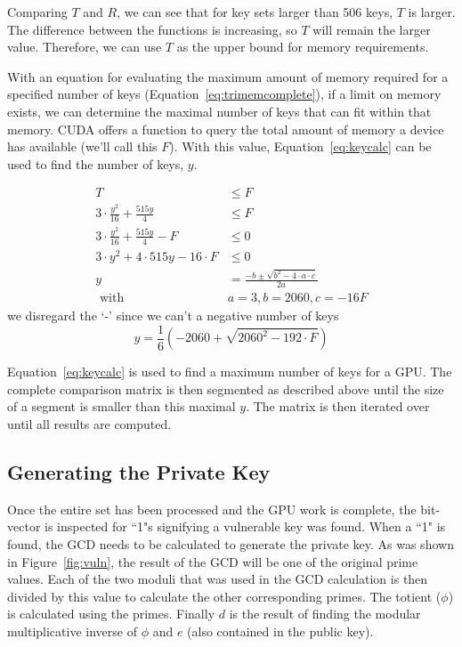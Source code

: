\documentclass[smallextended]{svjour3}       %
\begin{document}
Comparing $T$ and $R$, we can see that for key sets larger than 506 keys, $T$ is larger. The difference between the functions is increasing, so $T$ will remain the larger value. Therefore, we can use $T$ as the upper bound for memory requirements. 

With an equation for evaluating the maximum amount of memory required for a specified number of keys (Equation~\ref{eq:trimemcomplete}), if a limit on memory exists, we can determine the maximal number of keys that can fit within that memory. CUDA offers a function to query the total amount of memory a device has available (we'll call this $F$). With this value, Equation~\ref{eq:keycalc} can be used to find the number of keys, $y$.

\begin{align*}
   T & \leq F\\
   3 \cdot \frac{y^2}{16} + \frac{515y}{4} & \leq F\\
   3 \cdot \frac{y^2}{16} + \frac{515y}{4} - F & \leq 0\\
   3 \cdot y^2 + 4\cdot515y- 16 \cdot F & \leq 0\\
   y & = \frac{-b \pm \sqrt{b^2 - 4 \cdot a \cdot c}}{2a}\\
   \text{ with } & a = 3, b = 2060, c = -16F
\end{align*}
\noindent we disregard the `-' since we can't a negative number of keys
\begin{equation}
   y = \frac{1}{6}\left(-2060 + \sqrt{2060^2 - 192 \cdot F}\right)
   \label{eq:keycalc}
\end{equation}

Equation~\ref{eq:keycalc} is used to find a maximum number of keys for a GPU. The complete comparison matrix is then segmented as described above until the size of a segment is smaller than this maximal $y$. The matrix is then iterated over until all results are computed.

\subsection{Generating the Private Key}
\label{subsec:private}
Once the entire set has been processed and the GPU work is complete, the bit-vector is inspected for ``1"s signifying a vulnerable key was found. When a ``1" is found, the GCD needs to be calculated to generate the private key. As was shown in Figure~\ref{fig:vuln}, the result of the GCD will be one of the original prime values. Each of the two moduli that was used in the GCD calculation is then divided by this value to calculate the other corresponding primes. The totient ($\phi$) is calculated using the primes. Finally $d$ is the result of finding the modular multiplicative inverse of $\phi$ and $e$ (also contained in the public key).
\end{document}

